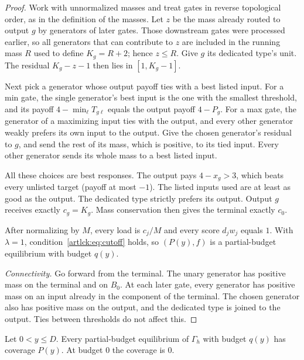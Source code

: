 \begin{proof}
Work with unnormalized masses and treat gates in reverse topological order, as in the definition of the
masses. Let $z$ be the mass already routed to output $g$ by generators of later gates. Those downstream
gates were processed earlier, so all generators that can contribute to $z$ are included in the running
mass $R$ used to define $K_g=R+2$; hence $z\le R$.
Give $g$ its dedicated type's unit. The residual $K_g-z-1$ then lies in $[1,K_g-1]$.

Next pick a generator whose output payoff ties with a best listed input. For a min gate, the single
generator's best input is the one with the smallest threshold, and its payoff $4-\min_\ell T_{g\ell}$
equals the output payoff $4-P_g$. For a max gate, the generator of a maximizing input ties with the
output, and every other generator weakly prefers its own input to the output. Give the chosen
generator's residual to $g$, and send the rest of its mass, which is positive, to its tied input. Every
other generator sends its whole mass to a best listed input.

All these choices are best responses. The output pays $4-x_g>3$, which beats every unlisted target
(payoff at most $-1$). The listed inputs used are at least as good as the output. The dedicated type
strictly prefers its output. Output $g$ receives exactly $c_g=K_g$. Mass conservation then gives the
terminal exactly $c_0$.

After normalizing by $M$, every load is $c_j/M$ and every score $d_jw_j$ equals $1$. With $\lambda=1$,
condition~\eqref{artlck:eq:cutoff} holds, so $(P(y),f)$ is a partial-budget equilibrium with budget
$q(y)$.

\emph{Connectivity.} Go forward from the terminal. The unary generator has positive mass on the terminal
and on $B_0$. At each later gate, every generator has positive mass on an input already in the component
of the terminal. The chosen generator also has positive mass on the output, and the dedicated type is
joined to the output. Ties between thresholds do not affect this.
\end{proof}

\begin{lemma}\label{artlck:lem:unique}
\statusrefereed
Let $0<y\le D$. Every partial-budget equilibrium of $\Gamma_h$ with budget $q(y)$ has coverage $P(y)$. At
budget $0$ the coverage is $0$.
\end{lemma}


